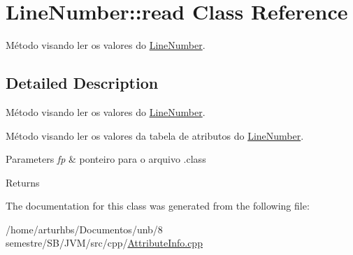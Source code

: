 \hypertarget{classLineNumber_1_1read}{}\section{Line\+Number\+:\+:read Class Reference}
\label{classLineNumber_1_1read}


Método visando ler os valores do \hyperlink{classLineNumber}{Line\+Number}.  




\subsection{Detailed Description}
Método visando ler os valores do \hyperlink{classLineNumber}{Line\+Number}. 

Método visando ler os valores da tabela de atributos do \hyperlink{classLineNumber}{Line\+Number}.


\begin{DoxyParams}{Parameters}
{\em fp} & ponteiro para o arquivo .class \\
\hline
\end{DoxyParams}
\begin{DoxyReturn}{Returns}

\end{DoxyReturn}


The documentation for this class was generated from the following file\+:\begin{DoxyCompactItemize}
\item 
/home/arturhbs/\+Documentos/unb/8 semestre/\+S\+B/\+J\+V\+M/src/cpp/\hyperlink{AttributeInfo_8cpp}{Attribute\+Info.\+cpp}\end{DoxyCompactItemize}
